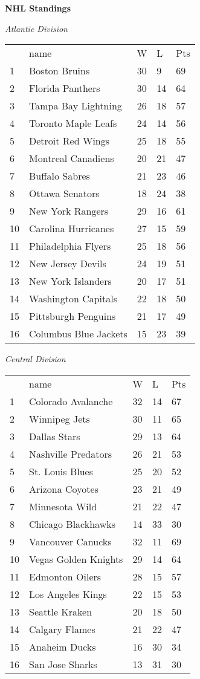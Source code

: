 \textbf{NHL Standings}

\textit{Atlantic Division}
\begin{tabular}{lllll}
 & name & W & L & Pts \\
1 & Boston Bruins & 30 & 9 & 69 \\
2 & Florida Panthers & 30 & 14 & 64 \\
3 & Tampa Bay Lightning & 26 & 18 & 57 \\
4 & Toronto Maple Leafs & 24 & 14 & 56 \\
5 & Detroit Red Wings & 25 & 18 & 55 \\
6 & Montreal Canadiens & 20 & 21 & 47 \\
7 & Buffalo Sabres & 21 & 23 & 46 \\
8 & Ottawa Senators & 18 & 24 & 38 \\
9 & New York Rangers & 29 & 16 & 61 \\
10 & Carolina Hurricanes & 27 & 15 & 59 \\
11 & Philadelphia Flyers & 25 & 18 & 56 \\
12 & New Jersey Devils & 24 & 19 & 51 \\
13 & New York Islanders & 20 & 17 & 51 \\
14 & Washington Capitals & 22 & 18 & 50 \\
15 & Pittsburgh Penguins & 21 & 17 & 49 \\
16 & Columbus Blue Jackets & 15 & 23 & 39 \\
\end{tabular}


\textit{Central Division}
\begin{tabular}{lllll}
 & name & W & L & Pts \\
1 & Colorado Avalanche & 32 & 14 & 67 \\
2 & Winnipeg Jets & 30 & 11 & 65 \\
3 & Dallas Stars & 29 & 13 & 64 \\
4 & Nashville Predators & 26 & 21 & 53 \\
5 & St. Louis Blues & 25 & 20 & 52 \\
6 & Arizona Coyotes & 23 & 21 & 49 \\
7 & Minnesota Wild & 21 & 22 & 47 \\
8 & Chicago Blackhawks & 14 & 33 & 30 \\
9 & Vancouver Canucks & 32 & 11 & 69 \\
10 & Vegas Golden Knights & 29 & 14 & 64 \\
11 & Edmonton Oilers & 28 & 15 & 57 \\
12 & Los Angeles Kings & 22 & 15 & 53 \\
13 & Seattle Kraken & 20 & 18 & 50 \\
14 & Calgary Flames & 21 & 22 & 47 \\
15 & Anaheim Ducks & 16 & 30 & 34 \\
16 & San Jose Sharks & 13 & 31 & 30 \\
\end{tabular}



